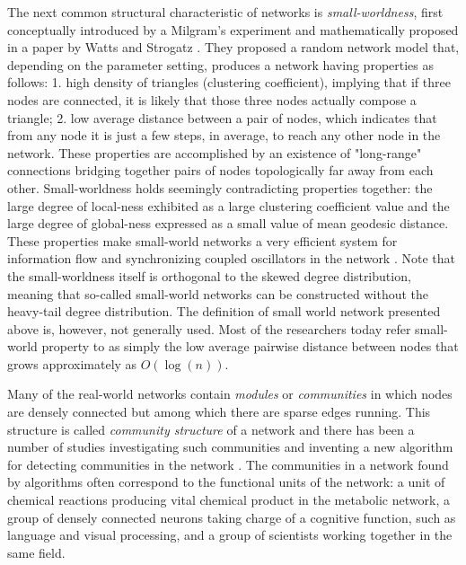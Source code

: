\documentclass{article}
\begin{document}
	The next common structural characteristic of networks is \textit{small-worldness}, first conceptually introduced by a Milgram's experiment \cite{Milgram} and mathematically proposed in a paper by Watts and Strogatz \cite{watts1998cds}. They proposed a random network model that, depending on the parameter setting, produces a network having properties as follows: 1. high density of triangles (clustering coefficient), implying that if three nodes are connected, it is likely that those three nodes actually compose a triangle; 2. low average distance between a pair of nodes, which indicates that from any node it is just a few steps, in average, to reach any other node in the network. These properties are accomplished by an existence of "long-range" connections bridging together pairs of nodes topologically far away from each other. Small-worldness holds seemingly contradicting properties together: the large degree of local-ness exhibited as a large clustering coefficient value and the large degree of global-ness expressed as a small value of mean geodesic distance.  These properties make small-world networks a very efficient system for information flow \cite{SmallWorldEfficiency} and synchronizing coupled oscillators in the network \cite{SmallWorldSynchronization}. Note that the small-worldness itself is orthogonal to the skewed degree distribution, meaning that so-called small-world networks can be constructed without the heavy-tail degree distribution. The definition of small world network presented above is, however, not generally used. Most of the researchers today refer small-world property to as simply the low average pairwise distance between nodes that grows approximately as $O(\log(n))$.
	
	
	Many of the real-world networks contain \textit{modules} or \textit{communities} in which nodes are densely connected but among which there are sparse edges running. This structure is called \textit{community structure} of a network and there has been a number of studies investigating such communities and inventing a new algorithm for detecting communities in the network \cite{Modularity1, Modularity2, ModularityReview}. The communities in a network found by algorithms often correspond to the functional units of the network: a unit of chemical reactions producing vital chemical product in the metabolic network, a group of densely connected neurons taking charge of a cognitive function, such as language and visual processing, and a group of scientists working together in the same field.
	
\end{document}
